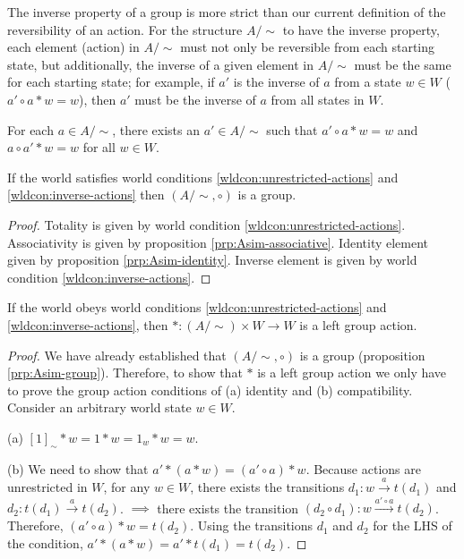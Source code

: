 The inverse property of a group is more strict than our current definition of the reversibility of an action.
For the structure $A/\sim$ to have the inverse property, each element (action) in $A/\sim$ must not only be reversible from each starting state, but additionally, the inverse of a given element in $A/\sim$ must be the same for each starting state; for example, if $a'$ is the inverse of $a$ from a state $w \in W$ ($a' \circ a * w = w$), then $a'$ must be the inverse of $a$ from all states in $W$.

\begin{world_condition}\label{wldcon:inverse-actions}
    For each $a \in A/\sim$, there exists an $a' \in A/\sim$ such that $a' \circ a * w = w$ and $a \circ a' * w = w$ for all $w \in W$.
\end{world_condition}


\begin{proposition}\label{prp:Asim-group}
    If the world satisfies world conditions \ref{wldcon:unrestricted-actions} and \ref{wldcon:inverse-actions} then $(A/\sim, \circ)$ is a group.
\end{proposition}
\begin{proof}
    Totality is given by world condition \ref{wldcon:unrestricted-actions}.
    Associativity is given by proposition \ref{prp:Asim-associative}.
    Identity element given by proposition \ref{prp:Asim-identity}.
    Inverse element is given by world condition \ref{wldcon:inverse-actions}.
\end{proof}

\begin{proposition}\label{prp:world-conditions-sufficient}
    If the world obeys world conditions \ref{wldcon:unrestricted-actions} and \ref{wldcon:inverse-actions}, then $*: (A/\sim) \times W \to W$ is a left group action.
\end{proposition}
\begin{proof}
    We have already established that $(A/\sim, \circ)$ is a group (proposition \ref{prp:Asim-group}).
    Therefore, to show that $*$ is a left group action we only have to prove the group action conditions of (a) identity and (b) compatibility.
    Consider an arbitrary world state $w \in W$.
    
    (a) $[1]_{\sim} * w = 1 * w = 1_{w} * w = w$.
    
    (b) We need to show that $a' * (a * w) = (a' \circ a) * w$.
    Because actions are unrestricted in $W$, for any $w \in W$, there exists the transitions $d_{1}: w \xrightarrow{a} t(d_{1})$ and $d_{2}: t(d_{1}) \xrightarrow{a} t(d_{2})$.
    $\implies$ there exists the transition $(d_{2} \circ d_{1}): w \xrightarrow{a' \circ a} t(d_{2})$.
    Therefore, $(a' \circ a) * w = t(d_{2})$.
    Using the transitions $d_{1}$ and $ d_{2}$ for the LHS of the condition, $a' * ( a * w) = a' * t(d_{1}) = t(d_{2})$.
\end{proof}

